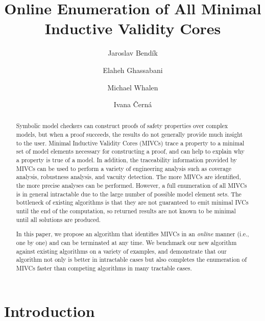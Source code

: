 \documentclass{llncs}
\begin{document}
\title{Online Enumeration of All Minimal Inductive Validity Cores}

\author{Jaroslav Bend\'ik 
	\and Elaheh Ghassabani
	\and Michael Whalen
	\and Ivana \v Cern\'a
}



\maketitle    
\begin{abstract} 
Symbolic model checkers can construct proofs of safety properties over complex models, but when a proof succeeds, the results do not generally provide much insight to the user.  Minimal Inductive Validity Cores (MIVCs) trace a property to a minimal set of model elements necessary for constructing a proof, and can help to explain why a property is true of a model.  In addition, the traceability information provided by MIVCs can be used to perform a variety of engineering analysis such as coverage analysis, robustness analysis, and vacuity detection.  The more MIVCs are identified, the more precise analyses can be performed.   However, a full enumeration of all MIVCs is in general intractable due to the large number of possible model element sets.  The bottleneck of existing algorithms is that they are not guaranteed to emit minimal IVCs until the end of the computation, so returned results are not known to be minimal until all solutions are produced.  

In this paper, we propose an algorithm that identifies MIVCs in an \emph{online} manner (i.e., one by one) and can be terminated at any time.  We benchmark our new algorithm against existing algorithms on a variety of examples, and demonstrate that our algorithm not only is better in intractable cases but also completes the enumeration of MIVCs faster than competing algorithms in many tractable cases.

\end{abstract} 
 
 
 
\section{Introduction}
\label{sec:intro}

\end{document}
